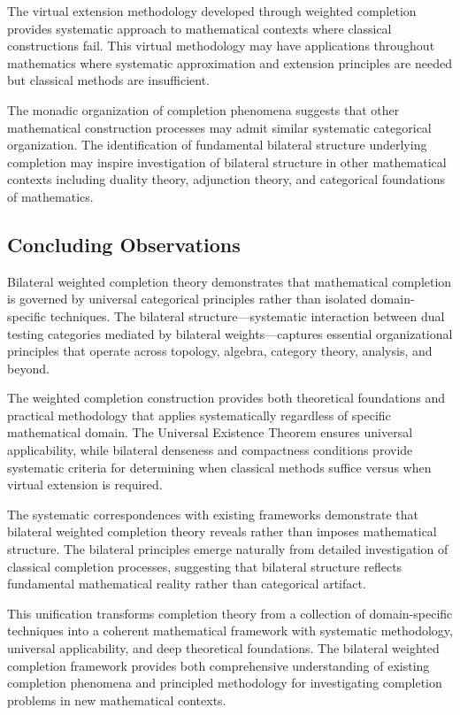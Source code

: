 \documentclass[11pt]{article}
\theoremstyle{plain}
\theoremstyle{definition}
\theoremstyle{remark}
\begin{document}
The virtual extension methodology developed through weighted completion provides systematic approach to mathematical contexts where classical constructions fail. This virtual methodology may have applications throughout mathematics where systematic approximation and extension principles are needed but classical methods are insufficient.

The monadic organization of completion phenomena suggests that other mathematical construction processes may admit similar systematic categorical organization. The identification of fundamental bilateral structure underlying completion may inspire investigation of bilateral structure in other mathematical contexts including duality theory, adjunction theory, and categorical foundations of mathematics.

\subsection{Concluding Observations}

Bilateral weighted completion theory demonstrates that mathematical completion is governed by universal categorical principles rather than isolated domain-specific techniques. The bilateral structure—systematic interaction between dual testing categories mediated by bilateral weights—captures essential organizational principles that operate across topology, algebra, category theory, analysis, and beyond.

The weighted completion construction provides both theoretical foundations and practical methodology that applies systematically regardless of specific mathematical domain. The Universal Existence Theorem ensures universal applicability, while bilateral denseness and compactness conditions provide systematic criteria for determining when classical methods suffice versus when virtual extension is required.

The systematic correspondences with existing frameworks demonstrate that bilateral weighted completion theory reveals rather than imposes mathematical structure. The bilateral principles emerge naturally from detailed investigation of classical completion processes, suggesting that bilateral structure reflects fundamental mathematical reality rather than categorical artifact.

This unification transforms completion theory from a collection of domain-specific techniques into a coherent mathematical framework with systematic methodology, universal applicability, and deep theoretical foundations. The bilateral weighted completion framework provides both comprehensive understanding of existing completion phenomena and principled methodology for investigating completion problems in new mathematical contexts.
\end{document}
